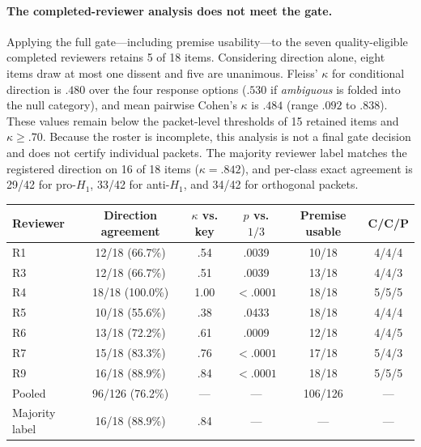 \paragraph{The completed-reviewer analysis does not meet the gate.} Applying the full
gate---including premise usability---to the seven quality-eligible completed
reviewers retains 5 of 18 items. Considering direction alone, eight items draw at
most one dissent and five are unanimous. Fleiss' $\kappa$ for conditional direction is $.480$ over the four
response options ($.530$ if \emph{ambiguous} is folded into the null category), and
mean pairwise Cohen's $\kappa$ is $.484$ (range $.092$ to $.838$). These values
remain below the packet-level thresholds of 15 retained items and
$\kappa\geq.70$. Because the roster is incomplete, this analysis is not a final gate decision
and does not certify individual packets. The majority reviewer label matches the registered direction
on 16 of 18 items ($\kappa=.842$), and per-class exact agreement is 29/42 for
pro-$H_1$, 33/42 for anti-$H_1$, and 34/42 for orthogonal packets.
\begin{center}
\begin{minipage}{\linewidth}
\centering
\small
{}
\label{tab:stage3-human}
\begin{tabular}{lccccc}
\toprule
Reviewer & Direction agreement & $\kappa$ vs. key & $p$ vs. $1/3$ & Premise usable & C/C/P \\
\midrule
R1 & 12/18 (66.7\%) & .54 & .0039 & 10/18 & 4/4/4 \\
R3 & 12/18 (66.7\%) & .51 & .0039 & 13/18 & 4/4/3 \\
R4 & 18/18 (100.0\%) & 1.00 & $<.0001$ & 18/18 & 5/5/5 \\
R5 & 10/18 (55.6\%) & .38 & .0433 & 18/18 & 4/4/4 \\
R6 & 13/18 (72.2\%) & .61 & .0009 & 12/18 & 4/4/5 \\
R7 & 15/18 (83.3\%) & .76 & $<.0001$ & 17/18 & 5/4/3 \\
R9 & 16/18 (88.9\%) & .84 & $<.0001$ & 18/18 & 5/5/5 \\
\midrule
Pooled & 96/126 (76.2\%) & --- & --- & 106/126 & --- \\
Majority label & 16/18 (88.9\%) & .84 & --- & --- & --- \\
\bottomrule
\end{tabular}
\end{minipage}
\end{center}

